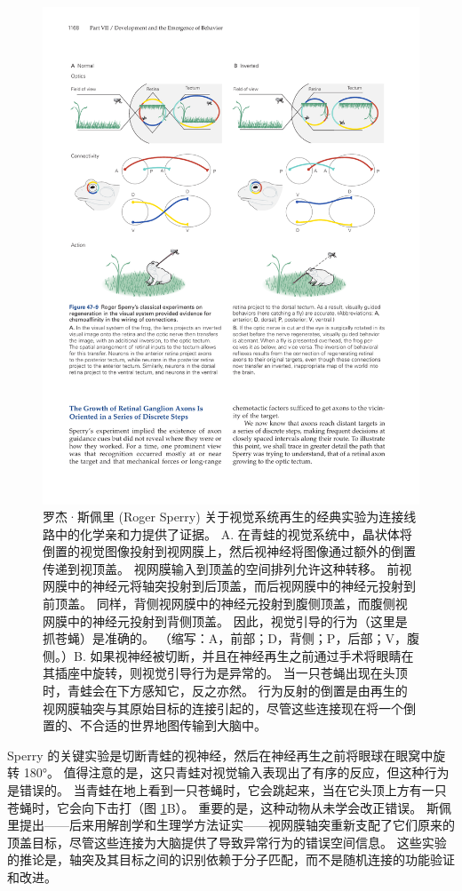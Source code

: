 \begin{figure}[htbp]
	\centering
	\includegraphics[width=0.9\linewidth]{chap47/fig_47_9}
	\caption{罗杰·斯佩里 (Roger Sperry) 关于视觉系统再生的经典实验为连接线路中的化学亲和力提供了证据。 A. 在青蛙的视觉系统中，晶状体将倒置的视觉图像投射到视网膜上，然后视神经将图像通过额外的倒置传递到视顶盖。 视网膜输入到顶盖的空间排列允许这种转移。 前视网膜中的神经元将轴突投射到后顶盖，而后视网膜中的神经元投射到前顶盖。 同样，背侧视网膜中的神经元投射到腹侧顶盖，而腹侧视网膜中的神经元投射到背侧顶盖。 因此，视觉引导的行为（这里是抓苍蝇）是准确的。 （缩写：A，前部；D，背侧；P，后部；V，腹侧。）B. 如果视神经被切断，并且在神经再生之前通过手术将眼睛在其插座中旋转，则视觉引导行为是异常的。 当一只苍蝇出现在头顶时，青蛙会在下方感知它，反之亦然。 行为反射的倒置是由再生的视网膜轴突与其原始目标的连接引起的，尽管这些连接现在将一个倒置的、不合适的世界地图传输到大脑中。}
	\label{fig:47_9}
\end{figure}

Sperry 的关键实验是切断青蛙的视神经，然后在神经再生之前将眼球在眼窝中旋转 180°。 值得注意的是，这只青蛙对视觉输入表现出了有序的反应，但这种行为是错误的。 当青蛙在地上看到一只苍蝇时，它会跳起来，当在它头顶上方有一只苍蝇时，它会向下击打（图 \ref{fig:47_9}B）。 重要的是，这种动物从未学会改正错误。 斯佩里提出——后来用解剖学和生理学方法证实——视网膜轴突重新支配了它们原来的顶盖目标，尽管这些连接为大脑提供了导致异常行为的错误空间信息。 这些实验的推论是，轴突及其目标之间的识别依赖于分子匹配，而不是随机连接的功能验证和改进。

